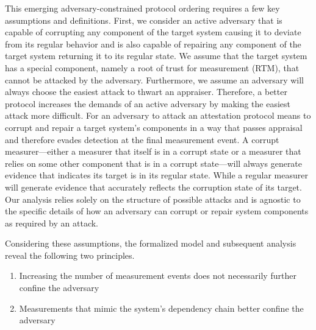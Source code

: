 \documentclass[runningheads]{llncs}
\theoremstyle{definition}
\newcommand{\squash}{\itemsep=0pt\parskip=0pt}
\begin{document}
This emerging adversary-constrained protocol ordering requires a few key assumptions and definitions. First, we consider an active adversary that is capable of corrupting any component of the target system causing it to deviate from its regular behavior and is also capable of repairing any component of the target system returning it to its regular state. We assume that the target system has a special component, namely a root of trust for measurement (RTM), that cannot be attacked by the adversary. Furthermore, we assume an adversary will always choose the easiest attack to thwart an appraiser. Therefore, a better protocol increases the demands of an active adversary by making the easiest attack more difficult. For an adversary to attack an attestation protocol means to corrupt and repair a target system's components in a way that passes appraisal and therefore evades detection at the final measurement event. A corrupt measurer---either a measurer that itself is in a corrupt state or a measurer that relies on some other component that is in a corrupt state---will always generate evidence that indicates its target is in its regular state. While a regular measurer will generate evidence that accurately reflects the corruption state of its target. Our analysis relies solely on the structure of possible attacks and is agnostic to the specific details of how an adversary can corrupt or repair system components as required by an attack.

Considering these assumptions, the formalized model and subsequent analysis reveal the following two principles.

\begin{enumerate}
    \item Increasing the number of measurement events does not necessarily further confine the adversary 
    \item Measurements that mimic the system's dependency chain better confine the adversary
\end{enumerate}

\end{document}
